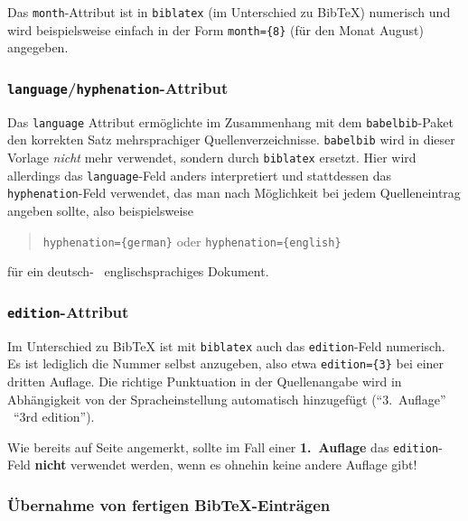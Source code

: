 Das \texttt{month}-Attribut ist in \texttt{biblatex} (im Unterschied zu BibTeX) numerisch
und wird beispielsweise einfach in der Form \verb!month={8}! (für den Monat August)
angegeben.

\subsubsection{\texttt{language}/\texttt{hyphenation}-Attribut}

Das \texttt{language} Attribut ermöglichte im Zusammenhang mit dem \texttt{babelbib}-Paket 
den korrekten Satz mehrsprachiger Quellenverzeichnisse. \texttt{babelbib} wird in 
dieser Vorlage \emph{nicht} mehr verwendet, sondern durch \texttt{biblatex} \cite{Lehman2011} ersetzt.
Hier wird allerdings das \texttt{language}-Feld anders interpretiert und
stattdessen das \texttt{hyphenation}-Feld verwendet, das man nach Möglichkeit 
bei jedem Quelleneintrag angeben sollte, also beispielsweise
\begin{quote}
\verb!hyphenation={german}! \quad oder \quad \verb!hyphenation={english}!
\end{quote}
für ein deutsch- \bzw\ englischsprachiges Dokument.

\subsubsection{\texttt{edition}-Attribut}

Im Unterschied zu BibTeX ist mit \texttt{biblatex} auch das \texttt{edition}-Feld numerisch.
Es ist lediglich die Nummer selbst anzugeben, also etwa
\verb!edition={3}!
bei einer dritten Auflage. Die richtige Punktuation in der Quellenangabe wird in Abhängigkeit von der Spracheinstellung automatisch hinzugefügt 
("`3.\ Auflage"' \bzw\ "`3rd edition"').

Wie bereits auf Seite \pageref{sec:@book} angemerkt, sollte im Fall einer
\textbf{1.~Auflage} das \texttt{edition}-Feld \textbf{nicht} verwendet werden,
wenn es ohnehin keine andere Auflage gibt!


\subsubsection{Übernahme von fertigen BibTeX-Einträgen}

